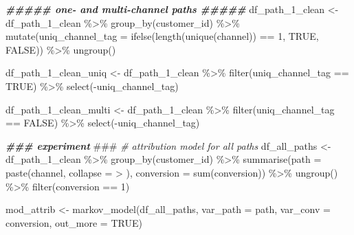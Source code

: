 \documentclass[
]{book}
\newenvironment{Shaded}{\begin{snugshade}}{\end{snugshade}}
\newcommand{\AlertTok}[1]{\textcolor[rgb]{0.94,0.16,0.16}{#1}}
\newcommand{\AttributeTok}[1]{\textcolor[rgb]{0.77,0.63,0.00}{#1}}
\newcommand{\CommentTok}[1]{\textcolor[rgb]{0.56,0.35,0.01}{\textit{#1}}}
\newcommand{\ConstantTok}[1]{\textcolor[rgb]{0.00,0.00,0.00}{#1}}
\newcommand{\DecValTok}[1]{\textcolor[rgb]{0.00,0.00,0.81}{#1}}
\newcommand{\DocumentationTok}[1]{\textcolor[rgb]{0.56,0.35,0.01}{\textbf{\textit{#1}}}}
\newcommand{\FunctionTok}[1]{\textcolor[rgb]{0.00,0.00,0.00}{#1}}
\newcommand{\NormalTok}[1]{#1}
\newcommand{\OtherTok}[1]{\textcolor[rgb]{0.56,0.35,0.01}{#1}}
\newcommand{\SpecialCharTok}[1]{\textcolor[rgb]{0.00,0.00,0.00}{#1}}
\newcommand{\StringTok}[1]{\textcolor[rgb]{0.31,0.60,0.02}{#1}}
\begin{document}
\begin{Shaded}
\begin{Highlighting}[]
\DocumentationTok{\#\#\#\#\# one{-} and multi{-}channel paths \#\#\#\#\#}
\NormalTok{df\_path\_1\_clean }\OtherTok{\textless{}{-}}\NormalTok{ df\_path\_1\_clean }\SpecialCharTok{\%\textgreater{}\%}
        \FunctionTok{group\_by}\NormalTok{(customer\_id) }\SpecialCharTok{\%\textgreater{}\%}
        \FunctionTok{mutate}\NormalTok{(}\AttributeTok{uniq\_channel\_tag =} \FunctionTok{ifelse}\NormalTok{(}\FunctionTok{length}\NormalTok{(}\FunctionTok{unique}\NormalTok{(channel)) }\SpecialCharTok{==} \DecValTok{1}\NormalTok{, }\ConstantTok{TRUE}\NormalTok{, }\ConstantTok{FALSE}\NormalTok{)) }\SpecialCharTok{\%\textgreater{}\%}
        \FunctionTok{ungroup}\NormalTok{()}
 
\NormalTok{df\_path\_1\_clean\_uniq }\OtherTok{\textless{}{-}}\NormalTok{ df\_path\_1\_clean }\SpecialCharTok{\%\textgreater{}\%}
        \FunctionTok{filter}\NormalTok{(uniq\_channel\_tag }\SpecialCharTok{==} \ConstantTok{TRUE}\NormalTok{) }\SpecialCharTok{\%\textgreater{}\%}
        \FunctionTok{select}\NormalTok{(}\SpecialCharTok{{-}}\NormalTok{uniq\_channel\_tag)}
 
\NormalTok{df\_path\_1\_clean\_multi }\OtherTok{\textless{}{-}}\NormalTok{ df\_path\_1\_clean }\SpecialCharTok{\%\textgreater{}\%}
        \FunctionTok{filter}\NormalTok{(uniq\_channel\_tag }\SpecialCharTok{==} \ConstantTok{FALSE}\NormalTok{) }\SpecialCharTok{\%\textgreater{}\%}
        \FunctionTok{select}\NormalTok{(}\SpecialCharTok{{-}}\NormalTok{uniq\_channel\_tag)}
 
\DocumentationTok{\#\#\# experiment }\AlertTok{\#\#\#}
\CommentTok{\# attribution model for all paths}
\NormalTok{df\_all\_paths }\OtherTok{\textless{}{-}}\NormalTok{ df\_path\_1\_clean }\SpecialCharTok{\%\textgreater{}\%}
        \FunctionTok{group\_by}\NormalTok{(customer\_id) }\SpecialCharTok{\%\textgreater{}\%}
        \FunctionTok{summarise}\NormalTok{(}\AttributeTok{path =} \FunctionTok{paste}\NormalTok{(channel, }\AttributeTok{collapse =} \StringTok{\textquotesingle{} \textgreater{} \textquotesingle{}}\NormalTok{),}
                  \AttributeTok{conversion =} \FunctionTok{sum}\NormalTok{(conversion)) }\SpecialCharTok{\%\textgreater{}\%}
        \FunctionTok{ungroup}\NormalTok{() }\SpecialCharTok{\%\textgreater{}\%}
        \FunctionTok{filter}\NormalTok{(conversion }\SpecialCharTok{==} \DecValTok{1}\NormalTok{)}
 
\NormalTok{mod\_attrib }\OtherTok{\textless{}{-}} \FunctionTok{markov\_model}\NormalTok{(df\_all\_paths,}
                           \AttributeTok{var\_path =} \StringTok{\textquotesingle{}path\textquotesingle{}}\NormalTok{,}
                           \AttributeTok{var\_conv =} \StringTok{\textquotesingle{}conversion\textquotesingle{}}\NormalTok{,}
                           \AttributeTok{out\_more =} \ConstantTok{TRUE}\NormalTok{)}
\end{Highlighting}
\end{Shaded}
\end{document}
